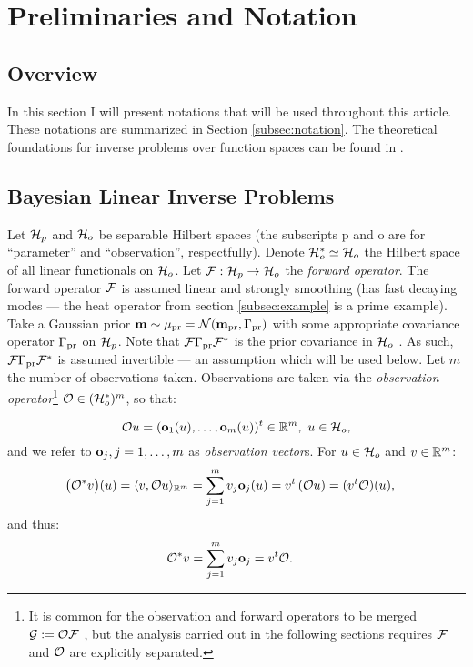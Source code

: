 \section{Preliminaries and Notation}\label{section:prelim}

\subsection{Overview}
In this section I will present notations that will be used throughout
this article. These notations are summarized in Section
\ref{subsec:notation}. The theoretical foundations for inverse
problems over function spaces can be found in
\cite{Stuart10}.


\subsection{Bayesian Linear Inverse Problems}\label{subsec:abstract OED}
Let $\mathcal{H}_p$ and $\mathcal{H}_o$ be separable Hilbert spaces (the subscripts p
and o are for ``parameter'' and ``observation'', respectfully). Denote
$\mathcal{H}_o^* \simeq \mathcal{H}_o$ the Hilbert space of all linear functionals on
$\mathcal{H}_o$. Let $\mathcal{F}: \mathcal{H}_p \to \mathcal{H}_o$ the \emph{forward operator}. The
forward operator $\mathcal{F}$ is assumed linear and strongly smoothing (has
fast decaying modes --- the heat operator from section
\ref{subsec:example} is a prime example). Take a Gaussian prior
$\mathbf{m} \sim \mu_{\textup{pr}} = \mathcal{N}(\mathbf{m}_{\textup{pr}} ,\Gamma_{\textup{pr}})$ with some appropriate
covariance operator $\Gamma_{\textup{pr}}$ \cite{Stuart10} on $\mathcal{H}_p$. Note that
$\mathcal{F} \Gamma_{\textup{pr}} \mathcal{F}^*$ is the prior covariance in $\mathcal{H}_o$
\cite{Stuart10}. As such, $\mathcal{F} \Gamma_{\textup{pr}} \mathcal{F}^*$ is assumed invertible
--- an assumption which will be used below. Let $m$ the number of
observations taken. Observations are taken via the \emph{observation
operator}\footnote{It is common for the observation and forward
operators to be merged $\mathcal{G} := \mathcal{O} \mathcal{F}$
\cite{AlexanderianGloorGhattas14}, but the analysis carried out in the
following sections requires $\mathcal{F}$ and $\mathcal{O}$ are explicitly
separated.} $\mathcal{O} \in ( \mathcal{H}_o^* )^m$, so that:

\begin{equation*}%
  \obs u = (\meas_1(u), \dots, \meas_m(u) )^t \in \R^m,\ u \in \hilo,
\end{equation*}
%
%
and we refer to $\mathbf{o}_j, j=1,\dots,m$ as \emph{observation
vector}s. For $u \in \mathcal{H}_o$ and $v\in \mathbb{R}^m$:
%
%
\begin{align*}
  \big (\obs^*v \big ) (u) &= \langle v, \obs u \rangle_{\R^m} = \sum_{j=1}^m  v_j \meas_j(u)
  = v^t \left ( \obs u \right ) = (v^t \obs) (u),
\end{align*}
and thus:
\begin{align}\label{eq:obs*}
  \obs^*v &= \sum_{j=1}^m v_j \meas_j = v^t \obs.
\end{align}

